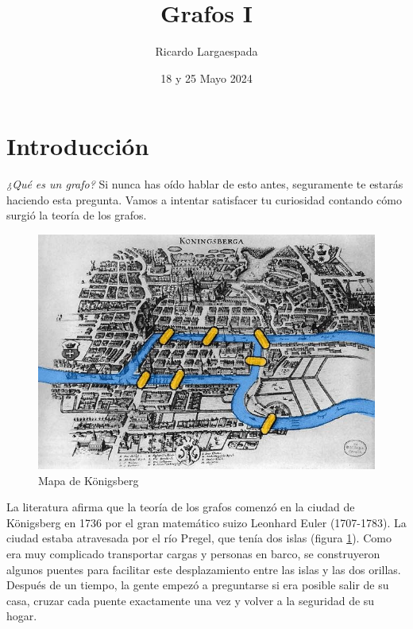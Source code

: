 \documentclass[11pt]{scrartcl}
\begin{document}
\title{Grafos I}
\author{Ricardo Largaespada}
\date{18 y 25 Mayo 2024}

\maketitle
\section{Introducción}
\textit{¿Qué es un grafo?} Si nunca has oído hablar de esto antes, seguramente te estarás haciendo esta pregunta. Vamos a intentar satisfacer tu curiosidad contando cómo surgió la teoría de los grafos.\\

\begin{figure}[h]
    \centering
    \includegraphics[scale=0.25]{images/clase_10_Mapa-de-1652-de-la-Ciudad-de-Koenigsberg-2-con-el-agua-y-los-puentes-resaltados.png}
    \caption{Mapa de Königsberg}
    \label{fig:1}
\end{figure}

La literatura afirma que la teoría de los grafos comenzó en la ciudad de Königsberg en 1736 por el gran matemático suizo Leonhard Euler (1707-1783). La ciudad estaba atravesada por el río Pregel, que tenía dos islas (figura \ref{fig:1}). Como era muy complicado transportar cargas y personas en barco, se construyeron algunos puentes para facilitar este desplazamiento entre las islas y las dos orillas. Después de un tiempo, la gente empezó a preguntarse si era posible salir de su casa, cruzar cada puente exactamente una vez y volver a la seguridad de su hogar.
\end{document}

